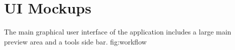 \section{UI Mockups}
{The main graphical user interface of the application includes a large main preview area and a tools side bar.}
{fig:workflow}


